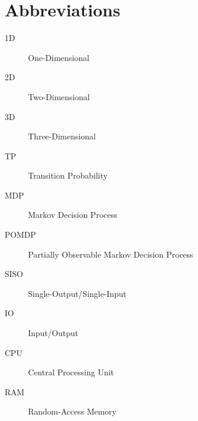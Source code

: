 \chapter*{Abbreviations}

\begin{description}
\item[1D] One-Dimensional
\item[2D] Two-Dimensional
\item[3D] Three-Dimensional
\item[TP] Transition Probability
\item[MDP] Markov Decision Process
\item[POMDP] Partially Observable Markov Decision Process
\item[SISO] Single-Output/Single-Input
\item[IO] Input/Output
\item[CPU] Central Processing Unit
\item[RAM] Random-Access Memory
\end{description}